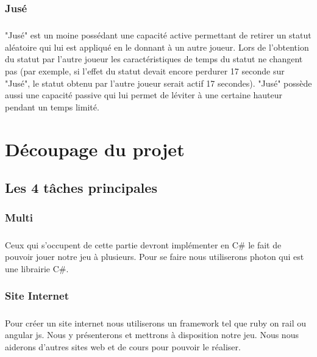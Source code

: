 \documentclass[12pt]{report}
\begin{document}
		\subsection{Jusé}
		\paragraph{}
			"Jusé" est un moine possédant une capacité active permettant de retirer un statut aléatoire qui lui est appliqué en le donnant à un autre joueur. Lors de l'obtention du statut par l'autre joueur les caractéristiques de temps du statut ne changent pas (par exemple, si l'effet du statut devait encore perdurer 17 seconde sur "Jusé", le statut obtenu par l'autre joueur serait actif 17 secondes).  "Jusé" possède aussi une capacité passive qui lui permet de léviter à une certaine hauteur pendant un temps limité.
					
\chapter{Découpage du projet} %

	\section{Les 4 tâches principales}
	
		\subsection{Multi}
		\paragraph{}
Ceux qui s'occupent de cette partie devront implémenter en C\# le 
fait de pouvoir jouer notre jeu à plusieurs. Pour se faire nous
utiliserons photon qui est une librairie C\#. 

		\subsection{Site Internet}
		\paragraph{}
Pour créer un site internet nous utiliserons un framework tel que
ruby on rail ou angular js. Nous y présenterons et mettrons à
disposition notre jeu. Nous nous aiderons d'autres sites web et 
de cours pour pouvoir le réaliser.
\end{document}
